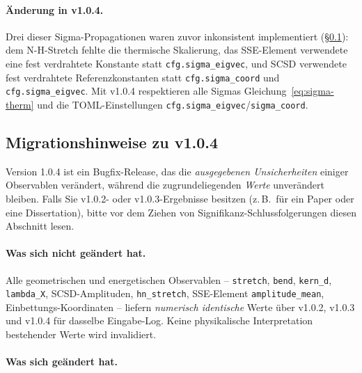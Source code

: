 \documentclass[11pt,a4paper,twoside]{article}
\theoremstyle{remark}
\begin{document}
\paragraph{\"Anderung in v1.0.4.} Drei dieser Sigma-Propagationen
waren zuvor inkonsistent implementiert
(\S\ref{sec:migration-v104}): dem N-H-Stretch fehlte die thermische
Skalierung, das SSE-Element verwendete eine fest verdrahtete Konstante
statt \texttt{cfg.sigma\_eigvec}, und SCSD verwendete fest verdrahtete
Referenzkonstanten statt \texttt{cfg.sigma\_coord} und
\texttt{cfg.sigma\_eigvec}. Mit v1.0.4 respektieren alle Sigmas
Gleichung~\ref{eq:sigma-therm} und die TOML-Einstellungen
\texttt{cfg.sigma\_eigvec}/\texttt{sigma\_coord}.

\subsection{Migrationshinweise zu v1.0.4}
\label{sec:migration-v104}

Version 1.0.4 ist ein Bugfix-Release, das die \emph{ausgegebenen
Unsicherheiten} einiger Observablen ver\"andert, w\"ahrend die
zugrundeliegenden \emph{Werte} unver\"andert bleiben. Falls Sie
v1.0.2- oder v1.0.3-Ergebnisse besitzen (z.\,B.\ f\"ur ein
Paper oder eine Dissertation), bitte vor dem Ziehen von
Signifikanz-Schlussfolgerungen diesen Abschnitt lesen.

\paragraph{Was sich nicht ge\"andert hat.} Alle geometrischen und
energetischen Observablen -- \texttt{stretch}, \texttt{bend},
\texttt{kern\_d}, \texttt{lambda\_X}, SCSD-Amplituden,
\texttt{hn\_stretch}, SSE-Element \texttt{amplitude\_mean},
Einbettungs-Koordinaten -- liefern \emph{numerisch identische} Werte
\"uber v1.0.2, v1.0.3 und v1.0.4 f\"ur dasselbe Eingabe-Log.
Keine physikalische Interpretation bestehender Werte wird
invalidiert.

\paragraph{Was sich ge\"andert hat.}
\end{document}

